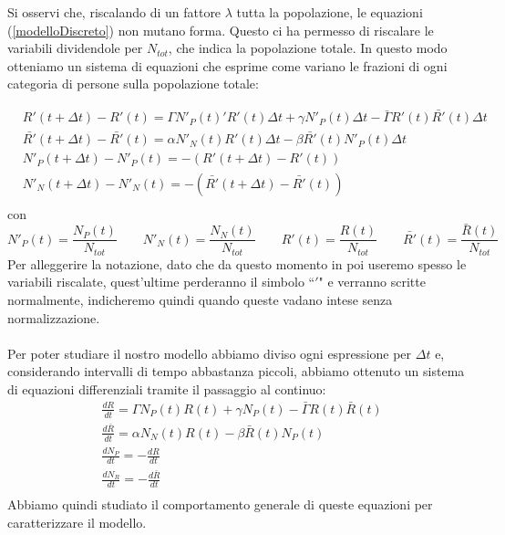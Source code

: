 Si osservi che, riscalando di un fattore $\lambda$ tutta la popolazione, le equazioni (\ref{modelloDiscreto}) non mutano forma. Questo ci ha permesso di riscalare le variabili dividendole per $ N_{tot}$, che indica la popolazione totale. In questo modo otteniamo un sistema di equazioni che esprime come variano le frazioni di ogni categoria di persone sulla popolazione totale:  

\begin{equation} \label{eq: 1.3}
	\begin{aligned}
		&R'(t+\Delta t)-R'(t)=\Gamma N'_P(t)'R'(t)\Delta t+\gamma N'_P(t)\Delta t-\bar{\Gamma}R'(t)\bar{R'}(t)\Delta t\\
	&\bar{R'}(t+\Delta t)-\bar{R'}(t)=\alpha N'_N(t)R'(t)\Delta t-\beta \bar{R'}(t)N'_P(t)\Delta t\\
	&N'_P(t+\Delta t)-N'_P(t)=-(R'(t+\Delta t)-R'(t))\\
	&N'_N(t+\Delta t)-N'_N(t)=-(\bar{R'}(t+\Delta t)-\bar{R'}(t))\\
	\end{aligned}
\end{equation}	
con 
\begin{equation*}
	N'_{P}(t)=\frac{N_{P}(t)}{N_{tot}} \qquad 	N'_{N}(t)=\frac{N_{N}(t)}{N_{tot}} \qquad	R'(t)=\frac{R(t)}{N_{tot}} \qquad	\bar{R'}(t)=\frac{\bar{R}(t)}{N_{tot}} 
\end{equation*}
Per alleggerire la notazione, dato che da questo momento in poi useremo spesso le variabili riscalate, quest'ultime perderanno il simbolo ``$ ' $" e verranno scritte normalmente, indicheremo quindi quando queste vadano intese senza normalizzazione. \\
%
\\
Per poter studiare il nostro modello abbiamo diviso ogni espressione per $ \Delta t $ e, considerando intervalli di tempo abbastanza piccoli, abbiamo ottenuto un sistema di equazioni differenziali tramite il passaggio al continuo:
\begin{equation} \label{eq:1.4}
		\begin{aligned}
			&\frac{dR}{dt}=\Gamma N_P(t) R(t)+\gamma N_P(t)-\bar{\Gamma}R(t)\bar{R}(t)\\
		&\frac{d\bar{R}}{dt}=\alpha N_N(t)R(t)-\beta \bar{R}(t)N_P(t)\\
		&\frac{dN_{P}}{dt}= -\frac{dR}{dt}\\
		&\frac{dN_{R}}{dt}= -\frac{d\bar{R}}{dt}\\
		\end{aligned}
\end{equation}
Abbiamo quindi studiato il comportamento generale di queste equazioni per caratterizzare il modello.
